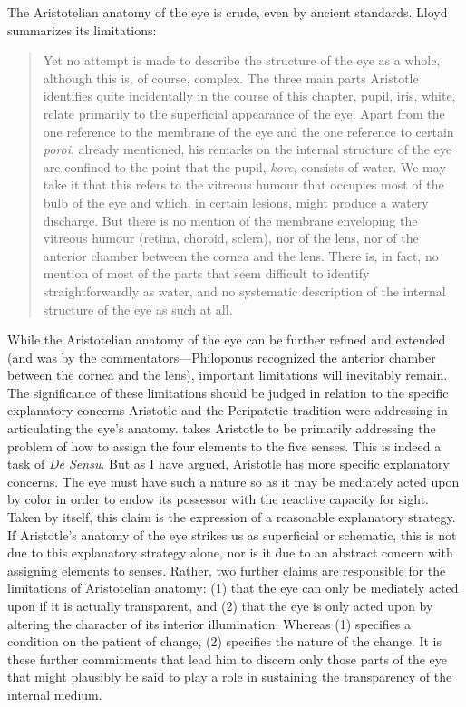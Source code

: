 The Aristotelian anatomy of the eye is crude, even by ancient standards. Lloyd summarizes its limitations:
\begin{quote}
	Yet no attempt is made to describe the structure of the eye as a whole, although this is, of course, complex. The three main parts Aristotle identifies quite incidentally in the course of this chapter, pupil, iris, white, relate primarily to the superficial appearance of the eye. Apart from the one reference to the membrane of the eye and the one reference to certain \emph{poroi}, already mentioned, his remarks on the internal structure of the eye are confined to the point that the pupil, \emph{kore}, consists of water. We may take it that this refers to the vitreous humour that occupies most of the bulb of the eye and which, in certain lesions, might produce a watery discharge. But there is no mention of the membrane enveloping the vitreous humour (retina, choroid, sclera), nor of the lens, nor of the anterior chamber between the cornea and the lens. There is, in fact, no mention of most of the parts that seem difficult to identify straightforwardly as water, and no systematic description of the internal structure of the eye as such at all. \citep[220--221]{Lloyd:1978fk}
\end{quote}
While the Aristotelian anatomy of the eye can be further refined and extended (and was by the commentators---Philoponus recognized the anterior chamber between the cor\-nea and the lens), important limitations will inevitably remain. The significance of these limitations should be judged in relation to the specific explanatory concerns Aristotle and the Peripatetic tradition were addressing in articulating the eye's anatomy. \citet{Lloyd:1978fk} takes Aristotle to be primarily addressing the problem of how to assign the four elements to the five senses. This is indeed a task of \emph{De Sensu}. But as I have argued, Aristotle has more specific explanatory concerns. The eye must have such a nature so as it may be mediately acted upon by color in order to endow its possessor with the reactive capacity for sight. Taken by itself, this claim is the expression of a reasonable explanatory strategy. If Aristotle's anatomy of the eye strikes us as superficial or schematic, this is not due to this explanatory strategy alone, nor is it due to an abstract concern with assigning elements to senses. Rather, two further claims are responsible for the limitations of Aristotelian anatomy: (1) that the eye can only be mediately acted upon if it is actually transparent, and (2) that the eye is only acted upon by altering the character of its interior illumination. Whereas (1) specifies a condition on the patient of change, (2) specifies the nature of the change. It is these further commitments that lead him to discern only those parts of the eye that might plausibly be said to play a role in sustaining the transparency of the internal medium.


